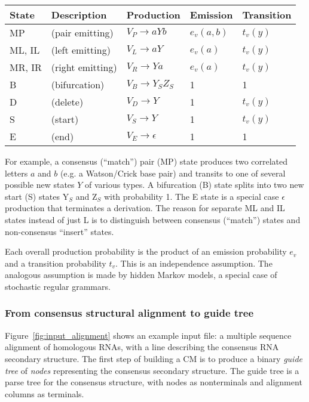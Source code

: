 \documentclass[11pt]{article}
\begin{document}
\vspace{0.5em}
\begin{tabular}{lllll}
State  & Description             &  Production             & Emission & Transition\\ \hline
MP  & (pair emitting)           & $V_P \rightarrow a Y b$ & $e_v(a,b)$ & $t_v(y)$  \\
ML, IL & (left emitting)       & $V_L \rightarrow a Y$   & $e_v(a)$   & $t_v(y)$  \\
MR, IR & (right emitting)      & $V_R \rightarrow Y a$   & $e_v(a)$   & $t_v(y)$  \\
B &  (bifurcation)    & $V_B \rightarrow Y_S Z_S$  & 1     &     1     \\
D & (delete)         & $V_D \rightarrow Y$     &    1     &   $t_v(y)$  \\
S & (start)          & $V_S \rightarrow Y$     &    1     &   $t_v(y)$  \\
E & (end)            & $V_E \rightarrow \epsilon$ & 1     &     1     \\
\end{tabular}
\vspace{0.5em}

For example, a consensus (``match'') pair (MP) state produces two
correlated letters $a$ and $b$ (e.g. a Watson/Crick base pair) and
transits to one of several possible new states $Y$ of various types.
A bifurcation (B) state splits into two new start (S) states Y$_{S}$
and Z$_{S}$ with probability 1.  The E state is a special case
$\epsilon$ production that terminates a derivation. The reason for
separate ML and IL states instead of just L is to distinguish between
consensus (``match'') states and non-consensus ``insert'' states.

Each overall production probability is the product of an emission
probability $e_v$ and a transition probability $t_v$. This is an
independence assumption. The analogous assumption is made by hidden
Markov models, a special case of stochastic regular grammars.

\subsubsection{From consensus structural alignment to guide tree}

Figure~\ref{fig:input_alignment} shows an example input file: a
multiple sequence alignment of homologous RNAs, with a line describing
the consensus RNA secondary structure. The first step of building a CM
is to produce a binary \emph{guide tree} of \emph{nodes} representing
the consensus secondary structure. The guide tree is a parse tree for
the consensus structure, with nodes as nonterminals and alignment
columns as terminals.
\end{document}
